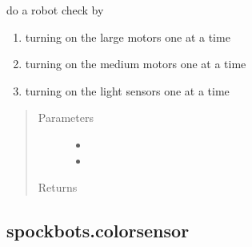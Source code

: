 \documentclass[letterpaper,10pt,english]{sphinxmanual}
\begin{document}
\begin{fulllineitems}
\label{\detokenize{spockbots:spockbots.check.check}}
do a robot check by
\begin{enumerate}
%
\item {} 
turning on the large motors one at a time

\item {} 
turning on the medium motors one at a time

\item {} 
turning on the light sensors one at a time

\end{enumerate}
\begin{quote}\begin{description}
\item[{Parameters}] \leavevmode\begin{itemize}
\item {} 
 \textendash{} 

\item {} 
 \textendash{} 

\end{itemize}

\item[{Returns}] \leavevmode


\end{description}\end{quote}

\end{fulllineitems}



\subsection{spockbots.colorsensor}
\label{\detokenize{spockbots:module-spockbots.colorsensor}}\label{\detokenize{spockbots:spockbots-colorsensor}}
\end{document}
